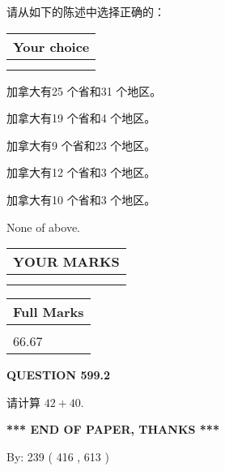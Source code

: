\documentclass{ctexart}
\begin{document}
  
请从如下的陈述中选择正确的：
  
  
\noindent\hspace{3.0in} \begin{tabular}{|l|}
\hline
Your choice \\
\hline
 \\ 
 \\ 
\hline
\end{tabular}
  
  
 
 
加拿大有25 个省和31 个地区。
 
 
加拿大有19 个省和4 个地区。
 
 
加拿大有9 个省和23 个地区。
 
 
加拿大有12 个省和3 个地区。
 
 
加拿大有10 个省和3 个地区。
 
 
 None of above.
 
 
  
\vspace{0.2in}
  
\noindent\begin{tabular}{|l|}
\hline
 YOUR MARKS  \\
\hline
 \\ 
 \\ 
\hline
\end{tabular}
\hspace{0.05in} \begin{tabular}{|l|}
\hline
 Full Marks  \\
\hline
 \\ 
66.67 \\
\hline
\end{tabular}
{\textbf{\Large{QUESTION
599.2 
}}}
  
  
 
请计算 $ %
42 +  %
40 $.
 

 

 
   
   
 \vspace{0.2in}
 
   
   
   
   
\vspace{1.0in} 
{\textbf{\large{ *** END OF PAPER, THANKS *** }}} 
   
   
\hspace{1.0in} By: 
 239 ( 416 ,  613 )
   
\end{document}
